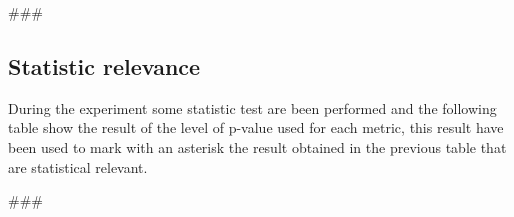 
\usepackage{comment}

###

\subsection{Statistic relevance}\label{subsec:stas_rel}
During the experiment some statistic test are been performed and the following table show the result
of the level of p-value used for each metric, this result have been used to mark with an asterisk
the result obtained in the previous table that are statistical relevant.

\hfill\break
###


\begin{comment}
Author = DIEGO MICCOLI
Alias = Kozen88
Organization = SWAP Research Group UniBa
Date = 27-12-2023

This mini template is not working by itself because there are latex command missing needed
to compile the file and give as output a pdf file, in addition it has been added jinja
statement in order to control the rendering of the latex file with the jinja library, for these
reasons it needs to be used with the other mini chunks in conjunction.
\end{comment}